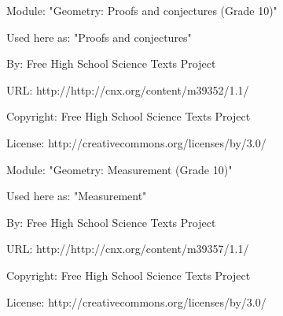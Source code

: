       \par\vspace{9pt}\noindent\begin{minipage}{\textwidth}
      Module: "Geometry: Proofs and conjectures (Grade 10)" \par\nopagebreak\noindent
      Used here as: "Proofs and conjectures" \par\nopagebreak\noindent
        By: Free High School Science Texts Project\par\nopagebreak\noindent
      URL: http://http://cnx.org/content/m39352/1.1/\par\nopagebreak\noindent
      \par\nopagebreak\noindent
      Copyright: Free High School Science Texts Project\par\nopagebreak\noindent
      License:  http://creativecommons.org/licenses/by/3.0/\par\nopagebreak\noindent
      \par\end{minipage}
      \par\vspace{9pt}\noindent\begin{minipage}{\textwidth}
      Module: "Geometry: Measurement (Grade 10)" \par\nopagebreak\noindent
      Used here as: "Measurement" \par\nopagebreak\noindent
        By: Free High School Science Texts Project\par\nopagebreak\noindent
      URL: http://http://cnx.org/content/m39357/1.1/\par\nopagebreak\noindent
      \par\nopagebreak\noindent
      Copyright: Free High School Science Texts Project\par\nopagebreak\noindent
      License:  http://creativecommons.org/licenses/by/3.0/\par\nopagebreak\noindent
      \par\end{minipage}
